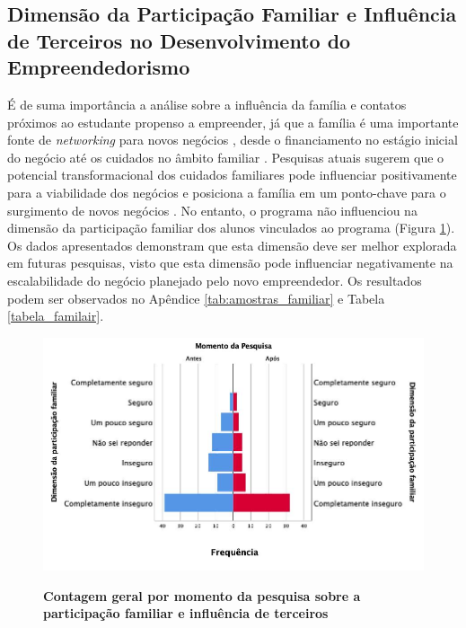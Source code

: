 \subsection{Dimensão da Participação Familiar e Influência de Terceiros no Desenvolvimento do Empreendedorismo}

É de suma importância a análise sobre a influência da família e contatos próximos ao estudante propenso a empreender, já que a família é uma importante fonte de \textit{networking} para novos negócios \cite{soto_does_2019,raza_influence_2019,kupp_when_2019}, desde o financiamento no estágio inicial do negócio \cite{soto_does_2019,edelman_impact_2016} até os cuidados no âmbito familiar \cite{meliou_family_2020}  \cite{puzi_transgenerational_2020}. Pesquisas atuais sugerem que o potencial transformacional dos cuidados familiares pode influenciar positivamente para a viabilidade dos negócios e posiciona a família em um ponto-chave para o surgimento de novos negócios \cite{georgescu_impact_2020,jena_measuring_2020,porfirio_family_2020}. No entanto, o programa não influenciou na dimensão da participação familiar dos alunos vinculados ao programa (Figura \ref{figura_60}). Os dados apresentados demonstram que esta dimensão deve ser melhor explorada em futuras pesquisas, visto que esta dimensão pode influenciar negativamente na escalabilidade do negócio planejado pelo novo empreendedor. Os resultados podem ser observados no Apêndice \ref{tab:amostras_familiar} e Tabela \ref{tabela_familair}.


\begin{figure}[H]
\centering
\caption{\textbf{Contagem geral por momento da pesquisa sobre a participação familiar e influência de terceiros}}
\includegraphics[scale=0.4]{Imagens/dimensao_familiar.jpg}
\label{figura_60}
\end{figure}

